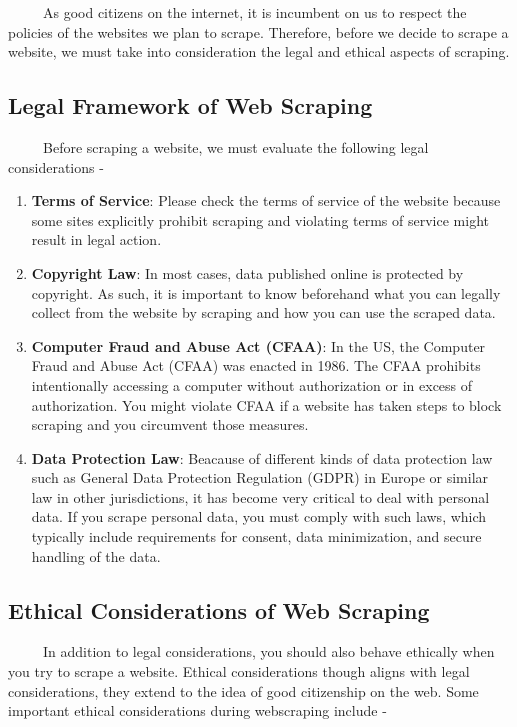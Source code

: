 \documentclass[
  letterpaper,
  DIV=11,
  numbers=noendperiod]{scrreprt}
\begin{document}
~~~~~As good citizens on the internet, it is incumbent on us to respect
the policies of the websites we plan to scrape. Therefore, before we
decide to scrape a website, we must take into consideration the legal
and ethical aspects of scraping.

\subsection{Legal Framework of Web
Scraping}\label{legal-framework-of-web-scraping}

~~~~~Before scraping a website, we must evaluate the following legal
considerations -

\begin{enumerate}
\def\labelenumi{\arabic{enumi}.}
\item
  \textbf{Terms of Service}: Please check the terms of service of the
  website because some sites explicitly prohibit scraping and violating
  terms of service might result in legal action.
\item
  \textbf{Copyright Law}: In most cases, data published online is
  protected by copyright. As such, it is important to know beforehand
  what you can legally collect from the website by scraping and how you
  can use the scraped data.
\item
  \textbf{Computer Fraud and Abuse Act (CFAA)}: In the US, the Computer
  Fraud and Abuse Act (CFAA) was enacted in 1986. The CFAA prohibits
  intentionally accessing a computer without authorization or in excess
  of authorization. You might violate CFAA if a website has taken steps
  to block scraping and you circumvent those measures.
\item
  \textbf{Data Protection Law}: Beacause of different kinds of data
  protection law such as General Data Protection Regulation (GDPR) in
  Europe or similar law in other jurisdictions, it has become very
  critical to deal with personal data. If you scrape personal data, you
  must comply with such laws, which typically include requirements for
  consent, data minimization, and secure handling of the data.
\end{enumerate}

\subsection{Ethical Considerations of Web
Scraping}\label{ethical-considerations-of-web-scraping}

~~~~~In addition to legal considerations, you should also behave
ethically when you try to scrape a website. Ethical considerations
though aligns with legal considerations, they extend to the idea of good
citizenship on the web. Some important ethical considerations during
webscraping include -
\end{document}
